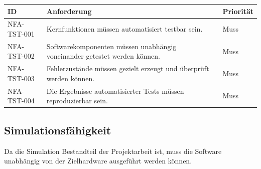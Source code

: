 \documentclass[
  a4paper,
  12pt,
  DIV=12,        %
  parskip=half,  %
  headings=small %
]{scrartcl}
\theoremstyle{definition}
\theoremstyle{definition}
\begin{document}
\begin{longtable}[]{@{}
  >{\raggedright\arraybackslash}p{}
  >{\raggedright\arraybackslash}p{}
  >{\raggedright\arraybackslash}p{}@{}}
\toprule\noalign{}
\begin{minipage}[b]{\linewidth}\raggedright
ID
\end{minipage} & \begin{minipage}[b]{\linewidth}\raggedright
Anforderung
\end{minipage} & \begin{minipage}[b]{\linewidth}\raggedright
Priorität
\end{minipage} \\
\midrule\noalign{}
\endhead
\bottomrule\noalign{}
\endlastfoot
NFA-TST-001 & Kernfunktionen müssen automatisiert testbar sein. &
Muss \\
NFA-TST-002 & Softwarekomponenten müssen unabhängig voneinander getestet
werden können. & Muss \\
NFA-TST-003 & Fehlerzustände müssen gezielt erzeugt und überprüft werden
können. & Muss \\
NFA-TST-004 & Die Ergebnisse automatisierter Tests müssen reproduzierbar
sein. & Muss \\
\end{longtable}

\subsection{Simulationsfähigkeit}\label{simulationsfuxe4higkeit}

Da die Simulation Bestandteil der Projektarbeit ist, muss die Software
unabhängig von der Zielhardware ausgeführt werden können.
\end{document}
